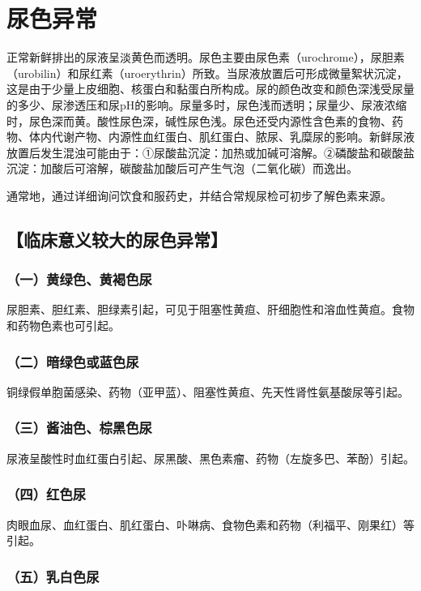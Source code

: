 \chapter{尿色异常}

正常新鲜排出的尿液呈淡黄色而透明。尿色主要由尿色素（urochrome），尿胆素（urobilin）和尿红素（uroerythrin）所致。当尿液放置后可形成微量絮状沉淀，这是由于少量上皮细胞、核蛋白和黏蛋白所构成。尿的颜色改变和颜色深浅受尿量的多少、尿渗透压和尿pH的影响。尿量多时，尿色浅而透明；尿量少、尿液浓缩时，尿色深而黄。酸性尿色深，碱性尿色浅。尿色还受内源性含色素的食物、药物、体内代谢产物、内源性血红蛋白、肌红蛋白、脓尿、乳糜尿的影响。新鲜尿液放置后发生混浊可能由于：①尿酸盐沉淀：加热或加碱可溶解。②磷酸盐和碳酸盐沉淀：加酸后可溶解，碳酸盐加酸后可产生气泡（二氧化碳）而逸出。

通常地，通过详细询问饮食和服药史，并结合常规尿检可初步了解色素来源。

\section{【临床意义较大的尿色异常】}

\subsection{（一）黄绿色、黄褐色尿}

尿胆素、胆红素、胆绿素引起，可见于阻塞性黄疸、肝细胞性和溶血性黄疸。食物和药物色素也可引起。

\subsection{（二）暗绿色或蓝色尿}

铜绿假单胞菌感染、药物（亚甲蓝）、阻塞性黄疸、先天性肾性氨基酸尿等引起。

\subsection{（三）酱油色、棕黑色尿}

尿液呈酸性时血红蛋白引起、尿黑酸、黑色素瘤、药物（左旋多巴、苯酚）引起。

\subsection{（四）红色尿}

肉眼血尿、血红蛋白、肌红蛋白、卟啉病、食物色素和药物（利福平、刚果红）等引起。

\subsection{（五）乳白色尿}

